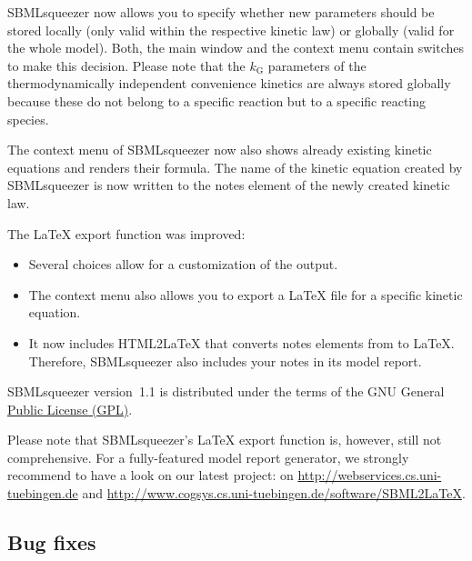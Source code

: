 \begin{dinglist}{52}
\item SBMLsqueezer now allows you to specify whether new parameters should be stored
locally (only valid within the respective kinetic law) or globally (valid for
the whole model). Both, the main window and the context menu contain switches to
make this decision. Please note that the $k_\mathrm{G}$ parameters of the
thermodynamically independent convenience kinetics are always stored globally
because these do not belong to a specific reaction but to a specific reacting
species.

\item The context menu of SBMLsqueezer now also shows already existing kinetic
equations and renders their formula. The name of the kinetic equation created by
SBMLsqueezer is now written to the notes element of the newly created kinetic
law.

\item The \LaTeX{} export function was improved:
\begin{itemize}
  \item Several choices allow for a customization of the output.
  \item The context menu also allows you to export a LaTeX file for a specific
        kinetic equation.
  \item It now includes HTML2\LaTeX{} that converts notes elements from \XHTML to
        \LaTeX. Therefore, SBMLsqueezer also includes your notes in its model
        report.
\end{itemize}

\item SBMLsqueezer version~1.1 is distributed under the terms of the GNU General
\href{http://www.gnu.org/licenses/gpl.html}{Public License (GPL)}.
\end{dinglist}

Please note that SBMLsqueezer's \LaTeX{} export function is, however, still not
comprehensive. For a fully-featured model report generator, we strongly recommend
to have a look on our latest project: \SBMLLaTeX on
\url{http://webservices.cs.uni-tuebingen.de} and
\url{http://www.cogsys.cs.uni-tuebingen.de/software/SBML2LaTeX}.

\subsection{Bug fixes}

